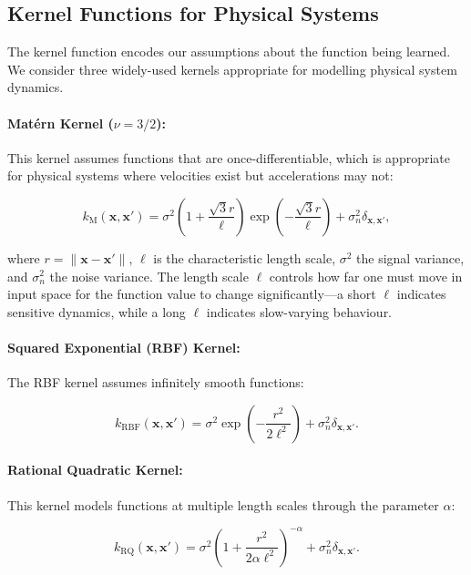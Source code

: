 \documentclass[conference]{IEEEtran}
\begin{document}
\subsection{Kernel Functions for Physical Systems}

The kernel function encodes our assumptions about the function being learned. We consider three widely-used kernels appropriate for modelling physical system dynamics.

\paragraph{Mat\'ern Kernel ($\nu = 3/2$):}
This kernel assumes functions that are once-differentiable, which is appropriate for physical systems where velocities exist but accelerations may not:

\begin{equation}
k_{\text{M}}(\mathbf{x}, \mathbf{x}') = \sigma^2 \left(1 + \frac{\sqrt{3}r}{\ell}\right) \exp\!\left(-\frac{\sqrt{3}r}{\ell}\right) + \sigma_n^2 \delta_{\mathbf{x},\mathbf{x}'},
\label{eq:matern}
\end{equation}

where $r = \|\mathbf{x} - \mathbf{x}'\|$, $\ell$ is the characteristic length scale, $\sigma^2$ the signal variance, and $\sigma_n^2$ the noise variance. The length scale $\ell$ controls how far one must move in input space for the function value to change significantly---a short $\ell$ indicates sensitive dynamics, while a long $\ell$ indicates slow-varying behaviour.

\paragraph{Squared Exponential (RBF) Kernel:}
The RBF kernel assumes infinitely smooth functions:

\begin{equation}
k_{\text{RBF}}(\mathbf{x}, \mathbf{x}') = \sigma^2 \exp\!\left(-\frac{r^2}{2\ell^2}\right) + \sigma_n^2 \delta_{\mathbf{x},\mathbf{x}'}.
\label{eq:rbf}
\end{equation}

\paragraph{Rational Quadratic Kernel:}
This kernel models functions at multiple length scales through the parameter $\alpha$:

\begin{equation}
k_{\text{RQ}}(\mathbf{x}, \mathbf{x}') = \sigma^2 \left(1 + \frac{r^2}{2\alpha\ell^2}\right)^{-\alpha} + \sigma_n^2 \delta_{\mathbf{x},\mathbf{x}'}.
\label{eq:rq}
\end{equation}
\end{document}
